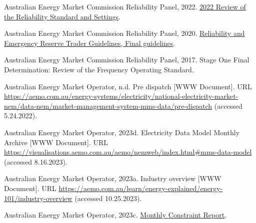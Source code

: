 \documentclass[12pt,a4paper,]{report}
\newlength{\cslhangindent}
\newenvironment{CSLReferences}[2] %
 {%
  \setlength{\parindent}{0pt}
  \ifodd #1 \everypar{\setlength{\hangindent}{\cslhangindent}}\ignorespaces\fi
  \ifnum #2 > 0
  \setlength{\parskip}{#2\baselineskip}
  \fi
 }%
 {}
\begin{document}
\begin{CSLReferences}{1}{0}
\leavevmode{}%
Australian Energy Market Commission Reliability Panel, 2022.
\href{https://www.aemc.gov.au/sites/default/files/2022-09/2022\%20RSS\%20Review\%20Final\%20Report\%20\%281\%29.pdf}{2022
{Review} of the {Reliability Standard} and {Settings}}.

\leavevmode{}%
Australian Energy Market Commission Reliability Panel, 2020.
\href{https://www.aemc.gov.au/sites/default/files/2020-08/Updated\%20Amended\%20Panel\%20RERT\%20Guidelines\%20-\%2018\%20August\%202020\%20-\%20Final\%20for\%20publication_0.pdf}{Reliability
and {Emergency Reserve Trader Guidelines}, {Final} guidelines}.

\leavevmode{}%
Australian Energy Market Commission Reliability Panel, 2017. Stage {One
Final Determination}: {Review} of the {Frequency Operating Standard}.

\leavevmode{}%
Australian Energy Market Operator, n.d. Pre dispatch {[}WWW Document{]}.
URL
\url{https://aemo.com.au/energy-systems/electricity/national-electricity-market-nem/data-nem/market-management-system-mms-data/pre-dispatch}
(accessed 5.24.2022).

\leavevmode{}%
Australian Energy Market Operator, 2023d. Electricity {Data Model
Monthly Archive} {[}WWW Document{]}. URL
\url{https://visualisations.aemo.com.au/aemo/nemweb/index.html\#mms-data-model}
(accessed 8.16.2023).

\leavevmode{}%
Australian Energy Market Operator, 2023a. Industry overview {[}WWW
Document{]}. URL
\url{https://aemo.com.au/learn/energy-explained/energy-101/industry-overview}
(accessed 10.25.2023).

\leavevmode{}%
Australian Energy Market Operator, 2023c.
\href{https://aemo.com.au/-/media/files/electricity/nem/security_and_reliability/congestion-information/statistics/2023/monthly-constraint-report-july-2023.pdf?la=en}{Monthly
{Constraint Report}}.


\end{CSLReferences}
\end{document}

